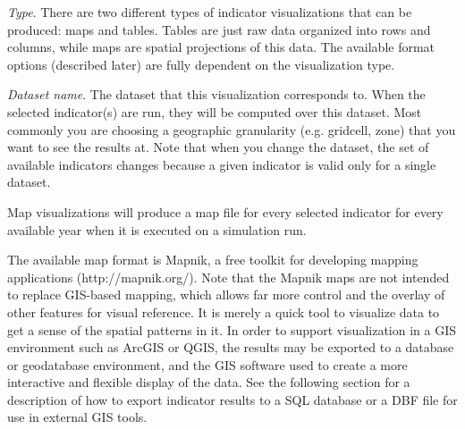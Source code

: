 \emph{Type}. There are two different types of indicator
visualizations that can be produced: maps and tables. Tables are just
raw data organized into rows and columns, while maps are
spatial projections of this data. The available format options
(described later) are fully dependent on the visualization type. 

\emph{Dataset name}. The dataset that this visualization corresponds
to. When the selected indicator(s) are run, they will be computed over
this dataset. Most commonly you are choosing a geographic granularity
(e.g. gridcell, zone) that you want to see the results at. Note that
when you change the dataset, the set of available indicators changes
because a given indicator is valid only for a single dataset.


Map visualizations  will produce a map file for every selected
indicator for every available year when it is executed on a
simulation run. 

The available map format is Mapnik, a free toolkit for developing 
mapping applications (http://mapnik.org/).  Note that the Mapnik maps 
are not intended to replace GIS-based mapping, which allows far more 
control and the overlay of other features for visual reference. It 
is merely a quick tool to visualize data to get a sense of the 
spatial patterns in it.  In order to support visualization in a 
GIS environment such as ArcGIS or QGIS, the results may be exported 
to a database or geodatabase environment, and the GIS software used 
to create a more interactive and flexible display of the data. See 
the following section for a description of how to export indicator 
results to a SQL database or a DBF file for use in external GIS tools.


